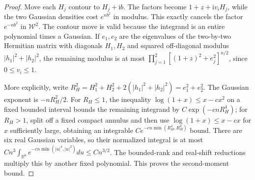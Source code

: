 \begin{proof}
Move each $H_j$ contour to $H_j+\mathrm i b$. The factors become
$1+z+\mathrm i v_iH_j$, while the two Gaussian densities cost
$e^{nb^2}$ in modulus. This exactly cancels the factor $e^{-nb^2}$
in $\mathcal W^2$. The contour move is valid because the integrand is
an entire polynomial times a Gaussian. If $e_1,e_2$ are the eigenvalues
of the two-by-two Hermitian matrix with diagonals $H_1,H_2$ and
squared off-diagonal modulus $|h_1|^2+|h_2|^2$, the remaining modulus
is at most $\prod_{j=1}^2[(1+z)^2+e_j^2]^{n/2}$, since $0\le v_i\le1$.

More explicitly, write
$R_H^2=H_1^2+H_2^2+2(|h_1|^2+|h_2|^2)=e_1^2+e_2^2$.
The Gaussian exponent is $-nR_H^2/2$. For $R_H\le1$, the inequality
$\log(1+x)\le x-cx^2$ on a fixed bounded interval bounds the remaining
integrand by $C\exp(-cnR_H^4)$; for $R_H>1$, split off a fixed compact
annulus and then use $\log(1+x)\le x-cx$ for $x$ sufficiently large,
obtaining an integrable $Ce^{-cn\min(R_H^4,R_H^2)}$ bound.
There are six real Gaussian variables, so their normalized integral is
at most $Cn^3\int_{\mathbb R^6}e^{-cn\min(|u|^4,|u|^2)}du
\le Cn^{3/2}$. The bounded-rank and real-shift reductions multiply this
by another fixed polynomial. This proves the second-moment bound.
\end{proof}


